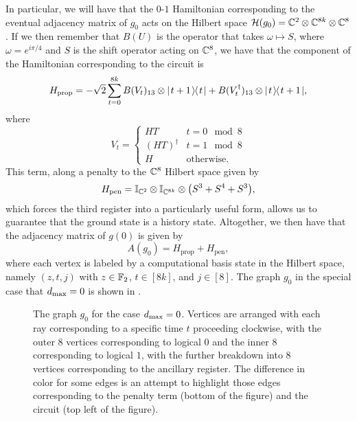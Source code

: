 \documentclass[../thesis-main/thesis-main]{subfiles}
\begin{document}
In particular, we will have that the $0$-$1$ Hamiltonian corresponding to the eventual adjacency matrix of $g_0$ acts on the Hilbert space $\mathcal{H}(g_0) = \mathbb{C}^{2}\otimes \mathbb{C}^{8k} \otimes \mathbb{C}^8$.  If we then remember that $B(U)$ is the operator that takes $\omega \mapsto S$, where $\omega = e^{i \pi/4}$ and  $S$ is the shift operator acting on $\mathbb{C}^{8}$, we have that the component of the Hamiltonian corresponding to the circuit is
\begin{equation}
  H_{\text{prop}} = -\sqrt{2} \sum_{t=0}^{8k} B(V_{t})_{13} \otimes |\mspace{2mu} t+1 \mspace{2mu} \rangle\mspace{-2mu}\langle\mspace{2mu} t \mspace{2mu} | + B(V_{t}^\dag)_{13} \otimes |\mspace{2mu} t \mspace{2mu} \rangle\mspace{-2mu}\langle\mspace{2mu} t+1 \mspace{2mu} |,
\end{equation}
where
\begin{equation}
  V_t = \begin{cases}
    HT & t = 0 \mod 8\\
    (HT)^{\dag} & t = 1 \mod 8\\
    H & \text{otherwise}.
  \end{cases}
\end{equation}
This term, along a penalty to the $\mathbb{C}^8$ Hilbert space given by
\begin{equation}
  H_{\text{pen}} = \mathbb{I}_{\mathbb{C}^2} \otimes \mathbb{I}_{\mathbb{C}^{8k}} \otimes \big( S^3 + S^4 + S^3\big),
\end{equation}
which forces the third register into a particularly useful form, allows us to guarantee that the ground state is a history state.  Altogether, we then have that the adjacency matrix of $g(0)$ is given by
\begin{equation}
  A(g_0) = H_{\text{prop}} + H_{\text{pen}},
\end{equation}
where each vertex is labeled by a computational basis state in the Hilbert space, namely $(z,t,j)$ with $z\in \mathbb{F}_2$, $t\in [8k]$, and $j\in[8]$.  The graph $g_0$ in the special case that $d_{\text{max}} = 0$ is shown in .

\begin{figure}
  \centering
  
  \caption{The graph $g_{0}$ for the case $d_{\text{max}} = 0$.  Vertices are arranged with each ray corresponding to a specific time $t$ proceeding clockwise, with the outer 8 vertices corresponding to logical $0$ and the inner 8 corresponding to logical $1$, with the further breakdown into 8 vertices corresponding to the ancillary register.  The difference in color for some edges is an attempt to highlight those edges corresponding to the penalty term (bottom of the figure) and the circuit (top left of the figure).  \label{fig:g_0}}
\end{figure}
\end{document}
